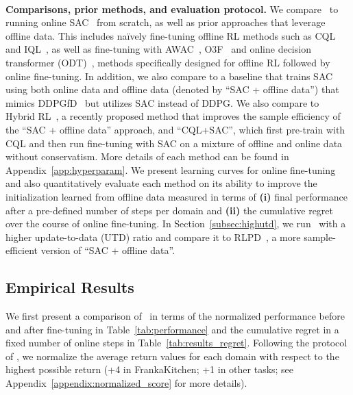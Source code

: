 ~

\noindent \textbf{Comparisons, prior methods, and evaluation protocol.} We compare \methodname\ to running online SAC~\cite{haarnoja2018soft} from scratch, as well as prior approaches that leverage offline data. This includes na\"ively fine-tuning offline RL methods such as CQL~\cite{kumar2020conservative} and IQL~\cite{kostrikov2021offlineb}, as well as fine-tuning with AWAC~\citep{nair2020accelerating}, O3F~\cite{mark2022fine} and online decision transformer (ODT)~\citep{zheng2022online}, methods specifically designed for offline RL followed by online fine-tuning. In addition, we also compare to a baseline that trains SAC~\cite{haarnoja2018soft} using both online data and offline data (denoted by ``SAC + offline data'') that mimics DDPGfD~\citep{vecerik2017leveraging} but utilizes SAC instead of DDPG. We also compare to Hybrid RL~\citep{song2023hybrid}, a recently proposed method that improves the sample efficiency of the ``SAC + offline data'' approach, and ``CQL+SAC'', which first pre-train with CQL and then run fine-tuning with SAC on a mixture of offline and online data without conservatism. More details of each method can be found in Appendix~\ref{app:hyperparam}.
We present learning curves for online fine-tuning and also quantitatively evaluate each method on its ability to improve the initialization learned from offline data measured in terms of \textbf{(i)} final performance after a pre-defined number of steps per domain and \textbf{(ii)} the cumulative regret over the course of online fine-tuning. In Section~\ref{subsec:highutd}, we run \methodname\ with a higher update-to-data (UTD) ratio and compare it to RLPD~\cite{rlpd}, a more sample-efficient version of ``SAC + offline data''.

\vspace{-0.2cm}
\subsection{Empirical Results} 
\vspace{-0.2cm}

We first present a comparison of \methodname\ in terms of the normalized performance before and after fine-tuning in Table~\ref{tab:performance} and the cumulative regret in a fixed number of online steps in Table~\ref{tab:results_regret}. Following the protocol of \cite{fu2020d4rl}, we normalize the average return values for each domain with respect to the highest possible return (+4 in FrankaKitchen; +1 in other tasks; see Appendix~\ref{appendix:normalized_score} for more details).  

